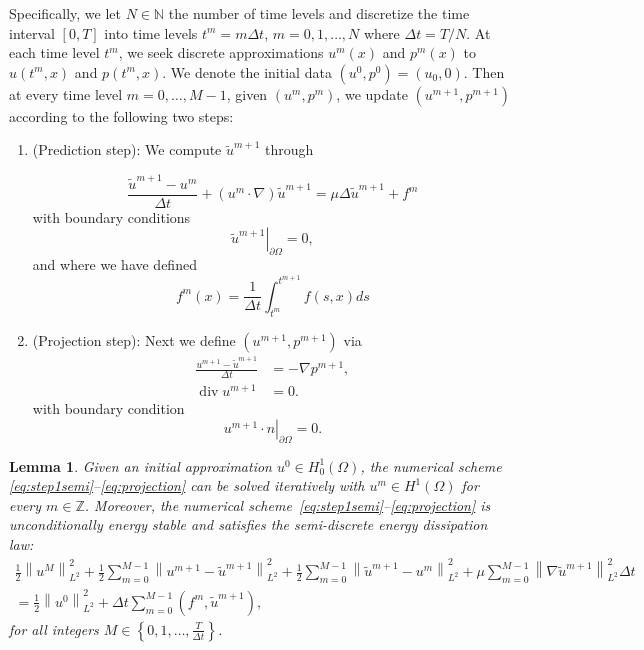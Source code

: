 \documentclass[10pt,letterpaper]{amsart}
\newcommand{\N}{\mathbb{N}}
\newcommand{\tu}{\widetilde{u}}
\newcommand\norm[1]{\left\lVert#1\right\rVert}
\newcommand{\Grad}{\nabla}
\newcommand{\Div}{\operatorname{div}}
\newcommand{\dom}{\Omega}
\newtheorem{lemma}{Lemma}[section]
\theoremstyle{definition}{\newtheorem{definition}[lemma]{Definition}}
\newcommand{\todofw}[1]{\todo[size=\tiny,author=FW,backgroundcolor=blue!20!white]{#1}}
\numberwithin{equation}{section}
\begin{document}
Specifically, we let $N\in \N$ the number of time levels and   discretize the time interval $[0,T]$ into time levels $t^m=m\Delta t$, $m=0,1,\dots, N$ where $\Delta t = T/N$. At each time level $t^m$, we seek discrete approximations $u^m(x)$ and $p^m(x)$ to $u(t^m,x)$ and $ p(t^m,x)$. We denote the initial data $(u^0, p^0)=(u_0,0)$. Then at every time level $m= 0,\dots, M-1$, given $(u^m,p^m)$,  we update $(u^{m+1}, p^{m+1})$ according to the following two steps:
\begin{enumerate}
	\item[{\bf Step 1}] (Prediction step): We compute $\tu^{m+1}$ through
		
		\begin{equation}\label{eq:step1semi}
		\frac{\tu^{m+1}-u^m}{\Delta t}+ (u^m\cdot\Grad)\tu^{m+1}= \mu \Delta \tu^{m+1}+f^{m}
		\end{equation}
	with boundary conditions 
	\begin{equation*}
	\left.\tu^{m+1}\right|_{\partial\dom}=0,
	\end{equation*}
	and where we have defined
	\begin{equation*}
		f^m(x)=\frac{1}{\Delta t}\int_{t^m}^{t^{m+1}}f(s,x) ds
	\end{equation*}
	\item[{\bf Step 2}] (Projection step): Next we define $(u^{m+1},p^{m+1})$ via
	\begin{subequations}
	\label{eq:projection}
	\begin{align}
	\frac{u^{m+1}-\tu^{m+1}}{\Delta t }&= -\Grad p^{m+1},\\
	\Div u^{m+1} & = 0.
		\end{align}	
	\end{subequations}
	with boundary condition
	\begin{equation}
	\label{eq:bcstep2}
	\left.u^{m+1}\cdot n\right|_{\partial \dom}=0.
	\end{equation}
\end{enumerate}
\begin{lemma}
	\label{thm:Solvability_scheme}
	Given an initial approximation $ u^0 \in H^1_0(\Omega) $,
	the numerical scheme \eqref{eq:step1semi}--\eqref{eq:projection} can be solved iteratively with $u^m\in H^1(\Omega)$ for every $m\in\mathbb{Z}$. Moreover, the numerical scheme~\eqref{eq:step1semi}--\eqref{eq:projection} is unconditionally energy stable and satisfies the semi-discrete energy dissipation law:
	\begin{multline}
	\label{eq:basic_semi-discrete_energy_law}
	\frac{1}{2}\norm{u^{M}}^2_{L^2}+\frac{1}{2}\sum_{m=0}^{M-1}\norm{u^{m+1}-\tu^{m+1}}_{L^2}^2
	+\frac{1}{2}\sum_{m=0}^{M-1}\norm{\tu^{m+1}-u^m}_{L^2}^2
	+\mu \sum_{m=0}^{M-1}\norm{\nabla\tu^{m+1}}_{L^2}^2\Delta t\\
	=\frac{1}{2}\norm{u^{0}}_{L^2}^2+\Delta t \sum_{m=0}^{M-1}(f^m,\tu^{m+1}),
	\end{multline}
	for all integers $M\in \left\{0,1,\dots,\frac{T}{\Delta t}\right\}$. 
\end{lemma}
\end{document}
